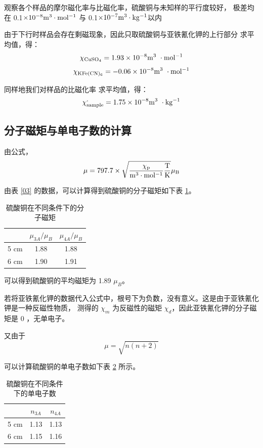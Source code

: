 \documentclass[cn,hazy,pku,12pt,normal,math=newtx,cite=super]{elegantnote}
\begin{document}
观察各个样品的摩尔磁化率与比磁化率，硫酸铜与未知样的平行度较好，
极差均在 
0.1$\rm \times 10^{-8} m^3 \cdot mol^{-1}$
与 0.1$\rm \times 10^{-7} m^3 \cdot kg^{-1}$以内

由于下行时样品会存在剩磁现象，因此只取硫酸铜与亚铁氰化钾的上行部分
求平均值，得：
$$
\rm \chi_{CuSO_4} = 1.93 \times 10^{-8} m^3\ \cdot mol^{-1}
$$
$$
\rm \chi_{KFe(CN)_6} = -0.06 \times 10^{-8} m^3\ \cdot mol^{-1}
$$

同样地我们对样品的比磁化率
求平均值，得：
$$
\rm\chi^,_{sample} = 1.75 \times 10^{-8} m^3\ \cdot kg^{-1}
$$
\subsection[short]{分子磁矩与单电子数的计算}

由公式，
$$
\rm \mu = 797.7 \times \sqrt{\frac{\chi_p}{m^3 \cdot mol^{-1}} \frac{T}{K}} \mu_B
$$

由表 \ref{03} 的数据，可以计算得到硫酸铜的分子磁矩如下表 \ref{05}。

\begin{table}[h]
    \centering
    \caption{硫酸铜在不同条件下的分子磁矩}
    \label{05}
    \begin{tabular}{ccc}\hline
         & $\mu_{3A}/\mu_B$ & $\mu_{4A}/\mu_B$ \\\hline
    5 cm & 1.88     & 1.88     \\
    6 cm & 1.90     & 1.91    \\\hline
    \end{tabular}
\end{table}

可以得到硫酸铜的平均磁矩为 1.89 $\mu_B$。

若将亚铁氰化钾的数据代入公式中，根号下为负数，没有意义。这是由于亚铁氰化钾是一种反磁性物质，
测得的 $\chi_m$ 为反磁性的磁矩 $\chi_d$，因此亚铁氰化钾的分子磁矩是 0 ，无单电子。

又由于
$$
\mu = \sqrt{n(n+2)}
$$

可以计算硫酸铜的单电子数如下表 \ref{06} 所示。

\begin{table}[h]
    \centering
    \caption{硫酸铜在不同条件下的单电子数}
    \label{06}
    \begin{tabular}{ccc}\hline
         & $n_{3A}$ & $n_{4A}$ \\\hline
    5 cm & 1.13     & 1.13     \\
    6 cm & 1.15     & 1.16    \\\hline
    \end{tabular}
\end{table}
\end{document}
